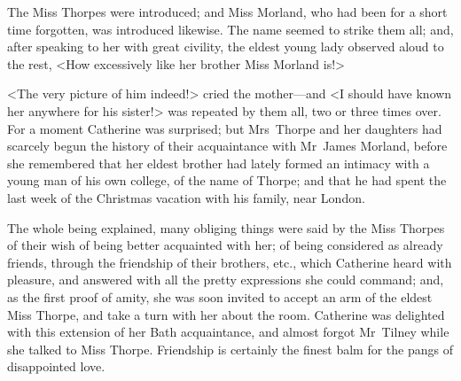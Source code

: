  The Miss Thorpes were introduced; and Miss Morland, who had been for a short time forgotten, was introduced likewise. The name seemed to strike them all; and, after speaking to her with great civility, the eldest young lady observed aloud to the rest, <How excessively like her brother Miss Morland is!> 

 <The very picture of him indeed!> cried the mother—and <I should have known her anywhere for his sister!> was repeated by them all, two or three times over. For a moment Catherine was surprised; but Mrs~Thorpe and her daughters had scarcely begun the history of their acquaintance with Mr~James Morland, before she remembered that her eldest brother had lately formed an intimacy with a young man of his own college, of the name of Thorpe; and that he had spent the last week of the Christmas vacation with his family, near London. 

 The whole being explained, many obliging things were said by the Miss Thorpes of their wish of being better acquainted with her; of being considered as already friends, through the friendship of their brothers, etc., which Catherine heard with pleasure, and answered with all the pretty expressions she could command; and, as the first proof of amity, she was soon invited to accept an arm of the eldest Miss Thorpe, and take a turn with her about the room. Catherine was delighted with this extension of her Bath acquaintance, and almost forgot Mr~Tilney while she talked to Miss Thorpe. Friendship is certainly the finest balm for the pangs of disappointed love. 

